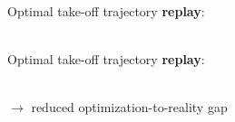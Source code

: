 \documentclass[aspectratio=169]{beamer}
\begin{document}
\begin{frame}
\begin{multicols}{2}
\vspace{0.5cm}\hphantom{e}\\
Optimal take-off trajectory \textbf{replay}:
\begin{figure}
	\centering
\end{figure}
\columnbreak
\hphantom{e}
\end{multicols}
\end{frame}

\begin{frame}
	\begin{multicols}{2}
		\vspace{0.5cm}\hphantom{e}\\
		Optimal take-off trajectory \textbf{replay}:
		\begin{figure}
			\centering
		\end{figure}
		\columnbreak
		\hphantom{e}\\
		\vspace{3cm}
		$\rightarrow$ reduced optimization-to-reality gap
	\end{multicols}
\end{frame}
\end{document}
